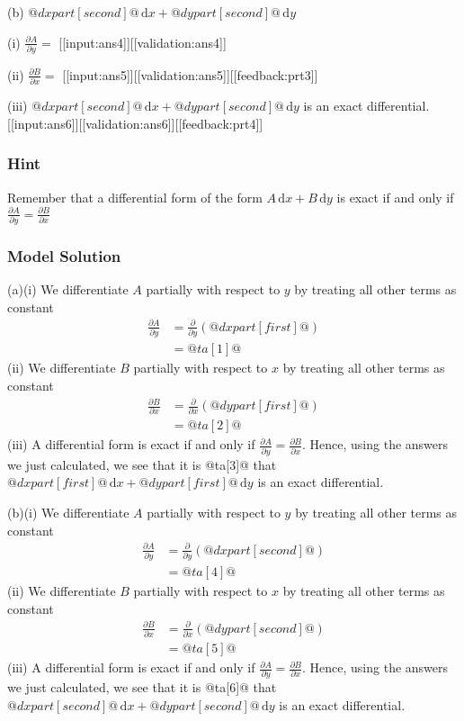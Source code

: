 \documentclass[a4paper,10pt]{article}
\begin{document}
(b) \(@dxpart[second]@ \, \text{d}x + @dypart[second]@ \, \text{d}y\)

(i) \(\frac{\partial A}{\partial y} = \) [[input:ans4]][[validation:ans4]]

(ii) \(\frac{\partial B}{\partial x} = \) [[input:ans5]][[validation:ans5]][[feedback:prt3]]

(iii) \(@dxpart[second]@ \, \text{d}x + @dypart[second]@ \, \text{d}y\) is an exact differential. [[input:ans6]][[validation:ans6]][[feedback:prt4]]
\subsubsection{Hint}
Remember that a differential form of the form \(A \, \text{d}x + B \, \text{d}y\) is exact if and only if \(\frac{\partial A}{\partial y} = \frac{\partial B}{\partial x}\)
\subsubsection{Model Solution}
(a)(i) We differentiate \(A\) partially with respect to \(y\) by treating all other terms as constant \begin{align*} \frac{\partial A}{\partial y} &= \frac{\partial}{\partial y} \left( @dxpart[first]@ \right) \\ &= @ta[1]@ \end{align*}(ii) We differentiate \(B\) partially with respect to \(x\) by treating all other terms as constant \begin{align*} \frac{\partial B}{\partial x} &= \frac{\partial}{\partial x} \left( @dypart[first]@ \right) \\ &= @ta[2]@ \end{align*}(iii) A differential form is exact if and only if \(\frac{\partial A}{\partial y} = \frac{\partial B}{\partial x}\). Hence, using the answers we just calculated, we see that it is @ta[3]@ that \(@dxpart[first]@ \, \text{d}x + @dypart[first]@ \, \text{d}y\) is an exact differential.

(b)(i) We differentiate \(A\) partially with respect to \(y\) by treating all other terms as constant \begin{align*} \frac{\partial A}{\partial y} &= \frac{\partial}{\partial y} \left( @dxpart[second]@ \right) \\ &= @ta[4]@ \end{align*}(ii) We differentiate \(B\) partially with respect to \(x\) by treating all other terms as constant \begin{align*} \frac{\partial B}{\partial x} &= \frac{\partial}{\partial x} \left( @dypart[second]@ \right) \\ &= @ta[5]@ \end{align*}(iii) A differential form is exact if and only if \(\frac{\partial A}{\partial y} = \frac{\partial B}{\partial x}\). Hence, using the answers we just calculated, we see that it is @ta[6]@ that \(@dxpart[second]@ \, \text{d}x + @dypart[second]@ \, \text{d}y\) is an exact differential.
\end{document}
